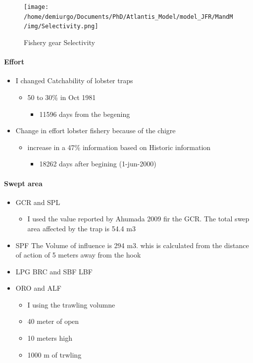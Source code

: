 \documentclass[11pt]{article}
\begin{document}
\begin{figure}[htb]
\centering
\texttt{[image: /home/demiurgo/Documents/PhD/Atlantis\_Model/model\_JFR/MandM/img/Selectivity.png]}
\caption{Fishery gear Selectivity}
\end{figure}
\paragraph*{Effort}
\label{sec-5-2-2-4}

\begin{itemize}
\item I changed Catchability of lobster traps
\begin{itemize}
\item 50 to 30\% in Oct 1981
\begin{itemize}
\item 11596 days from the begening
\end{itemize}
\end{itemize}
\item Change in effort lobster fishery because of the chigre
\begin{itemize}
\item increase in a 47\% information based on Historic information
\begin{itemize}
\item 18262 days after begining (1-jun-2000)
\end{itemize}
\end{itemize}
\end{itemize}
\paragraph*{Swept area}
\label{sec-5-2-2-5}

\begin{itemize}
\item GCR and SPL
\begin{itemize}
\item I used the value reported by Ahumada 2009 fir the GCR. The total swep area affected by the trap is 54.4 m3
\end{itemize}
\item SPF
   The Volume of influence is 294 m3. whis is calculated from the distance of action of 5 meters away from the hook
\item LPG BRC and SBF LBF
\item ORO and ALF
\begin{itemize}
\item I using the trawling volumne
\item 40 meter of open
\item 10 meters high
\item 1000 m of trwling
\end{itemize}
\end{itemize}
\end{document}
